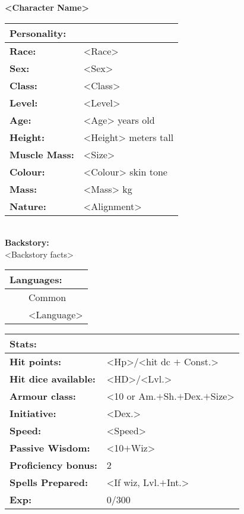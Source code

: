 \documentclass[11pt]{article}
\newcommand{\tabitem}{~~\llap{--}~~}
\begin{document}
	\begin{center}
\Huge \textbf{<Character Name>}
	\end{center}
	\begin{multicols}{2}
\noindent \begin{tabularx}{\linewidth}{@{}l l}
\Large \textbf{Personality:} 	& 						\\
\hline
\textbf{Race:} 					& <Race>	 			\\
\textbf{Sex:} 					& <Sex> 				\\
\textbf{Class:}					& <Class>				\\
\textbf{Level:} 				& <Level>				\\
\textbf{Age:} 					& <Age> years old		\\
\textbf{Height:} 				& <Height> meters tall 	\\
\textbf{Muscle Mass:} 			& <Size> 				\\
\textbf{Colour:} 				& <Colour> skin tone 	\\
\textbf{Mass:} 					& <Mass> kg		 		\\
\textbf{Nature:} 				& <Alignment>
		\end{tabularx} \\
\textbf{Backstory:} \\
<Backstory facts>

\noindent \begin{tabularx}{\linewidth}{@{}l}
{\Large \textbf{Languages:}} \\
\hline
\tabitem Common \\
\tabitem <Language>
		\end{tabularx}

\vspace{4mm}

\noindent \begin{tabularx}{\linewidth}{@{}l l}
\Large \textbf{Stats:}		 	& 									\\
\hline
\textbf{Hit points:} 			& <Hp>/<hit dc $+$ Const.> 			\\
\textbf{Hit dice available:}	& <HD>/<Lvl.>						\\
\textbf{Armour class:} 			& <10 or Am.$+$Sh.$+$Dex.$+$Size> 	\\
\textbf{Initiative:} 			& <Dex.>							\\
\textbf{Speed:} 				& <Speed>	 						\\
\textbf{Passive Wisdom:} 		& <10$+$Wiz>	 					\\
\textbf{Proficiency bonus:}		& 2									\\
\textbf{Spells Prepared:} 		& <If wiz, Lvl.$+$Int.>				\\
\textbf{Exp:} 					& 0/300
		\end{tabularx}


\end{multicols}
\end{document}
